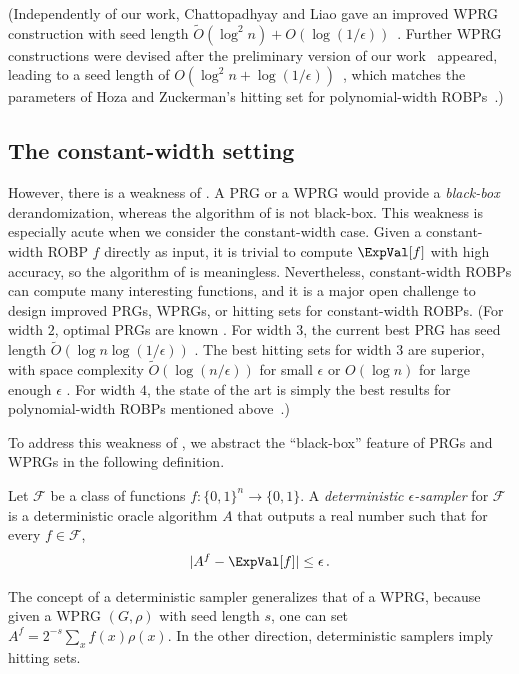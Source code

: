 (Independently of our work, Chattopadhyay and Liao gave an improved WPRG construction with seed length $\widetilde{O}(\log^2 n) + O(\log(1/\epsilon))$~\cite{CL20}. Further WPRG constructions were devised after the preliminary version of our work~\cite{conf-version} appeared, leading to a seed length of $O(\log^2 n + \log(1/\epsilon))$~\cite{CDRSTS21,PV21,Hoz21}, which matches the parameters of Hoza and Zuckerman's hitting set for polynomial-width ROBPs~\cite{HZ20}.)

\subsection{The constant-width setting}

However, there is a weakness of . A PRG or a WPRG would provide a \emph{black-box} derandomization, whereas the algorithm of  is not black-box. This weakness is especially acute when we consider the constant-width case. Given a constant-width ROBP $f$ directly as input, it is trivial to compute $\ExpVal[f]$ with high accuracy, so the algorithm of  is meaningless. Nevertheless, constant-width ROBPs can compute many interesting functions, and it is a major open challenge to design improved PRGs, WPRGs, or hitting sets for constant-width ROBPs. (For width $2$, optimal PRGs are known \cite{BDVY13}. For width $3$, the current best PRG has seed length $\widetilde{O}(\log n \log(1/\epsilon))$ \cite{MRT19}. The best hitting sets for width $3$ are superior, with space complexity $\widetilde{O}(\log(n/\epsilon))$ for small $\epsilon$ \cite{GMRTV12} or $O(\log n)$ for large enough $\epsilon$ \cite{SZ21}. For width $4$, the state of the art is simply the best results for polynomial-width ROBPs mentioned above~\cite{Nis92,HZ20,Hoz21}.)

To address this weakness of , we abstract the ``black-box'' feature of PRGs and WPRGs in the following definition.

\begin{definition}
Let $\mathcal{F}$ be a class of functions $f \colon \{0, 1\}^n \to \{0, 1\}$. A \emph{deterministic $\epsilon$-sampler} for $\mathcal{F}$ is a deterministic oracle algorithm $A$ that outputs a real number such that for every $f \in \mathcal{F}$,
$$
|A^f - \ExpVal[f]| \leq \epsilon\,.
$$
\end{definition}

The concept of a deterministic sampler generalizes that of a WPRG, because given a WPRG $(G, \rho)$ with seed length $s$, one can set $A^f = 2^{-s} \sum_x f(x) \rho(x)$. In the other direction, deterministic samplers imply hitting sets.

